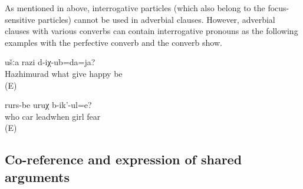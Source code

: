 As mentioned in  above, interrogative particles (which also belong to the focus-sensitive particles) cannot be used in adverbial clauses. However, adverbial clauses with various converbs can contain interrogative pronouns as the following examples with the perfective converb  and the converb   show. 
%
\begin{exe}
	\ex	\label{ex:When Hazhimurad was given what we were happy}
		ušːa	razi	d-iχ-ub=da=ja?\\
		Hazhimurad	what	give		happy	be\\
	\glt	{} (E) 

	\ex	\label{ex:‎When who is guiding the car the girls get afraid}
	\gll	[hi-l	mašin	b-ik-an=qːel]	rurs-be	uruχ	b-ik'-ul=e?\\
		who	car	leadwhen	girl	fear		\\
	\glt	{} (E) 
\end{exe}



\subsection{Co-reference and expression of shared arguments}
\label{ssec:Co-reference and expression of shared arguments}

